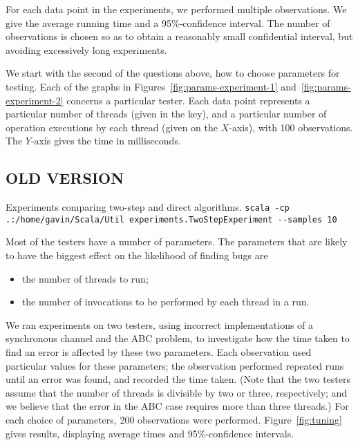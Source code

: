 For each data point in the experiments, we performed multiple observations.
We give the average running time and a 95\%-confidence interval.  The number
of observations is chosen so as to obtain a reasonably small confidential
interval, but avoiding excessively long experiments.


We start with the second of the questions above, how to choose parameters for
testing.  Each of the graphs in Figures~\ref{fig:params-experiment-1}
and~\ref{fig:params-experiment-2} concerns a particular
tester.  Each data point represents a particular number of threads (given in
the key), and a particular number of operation executions by each thread
(given on the $X$-axis), with 100 observations.  The $Y$-axis gives the time
in milliseconds. 






\subsection{OLD VERSION}

  Experiments comparing two-step and direct algorithms.  
\verb!scala -cp .:/home/gavin/Scala/Util experiments.TwoStepExperiment --samples 10!




Most of the testers have a number of parameters.  The parameters that are
likely to have the biggest effect on the likelihood of finding bugs are
%
\begin{itemize}
\item the number of threads to run;
\item the number of invocations to be performed by each thread in a run.
\end{itemize}
%
We ran experiments on two testers, using incorrect implementations of a
synchronous channel and the ABC problem, to investigate how the time taken to
find an error is affected by these two parameters.  Each observation used
particular values for these parameters; the observation performed repeated
runs until an error was found, and recorded the time taken.  (Note that the
two testers assume that the number of threads is divisible by two or three,
respectively; and we believe that the error in the ABC case requires more than
three threads.)  For each choice of parameters, 200 observations were
performed.  Figure~\ref{fig:tuning} gives results, displaying average times
and 95\%-confidence intervals.

